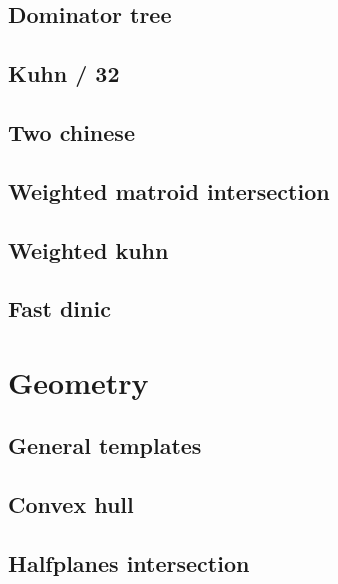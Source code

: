 \subsection{Dominator tree}
\raggedbottom
\hrulefill
\subsection{Kuhn / 32}
\raggedbottom
\hrulefill
\subsection{Two chinese}
\raggedbottom
\hrulefill
\subsection{Weighted matroid intersection}
\raggedbottom
\hrulefill
\subsection{Weighted kuhn}
\raggedbottom
\hrulefill
\subsection{Fast dinic}
\raggedbottom
\hrulefill

\section{Geometry}
\subsection{General templates}
\raggedbottom
\hrulefill
\subsection{Convex hull}
\raggedbottom
\hrulefill
\subsection{Halfplanes intersection}
\raggedbottom
\hrulefill

